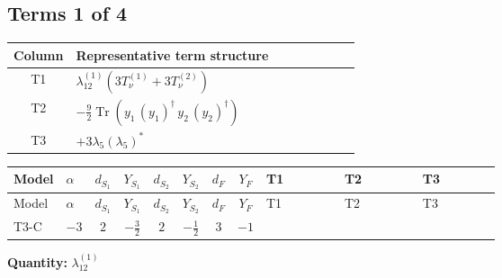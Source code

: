 \documentclass[8pt]{article}
\begin{document}
\begin{landscape}
\subsection*{Terms 1 of 4}
\begin{center}
\begin{tabular}{@{}c >{\raggedright\arraybackslash}p{0.82\linewidth}@{}}
\toprule
Column & Representative term structure \\
\midrule
T1 & \(\displaystyle {\lambda_{12}^{(1)}} (3 T_{\nu}^{(1)}+3 T_{\nu}^{(2)})\) \\
\midrule
T2 & \(\displaystyle -\frac{9}{2} \operatorname{Tr}\!\left({y_1}\,\left({y_1}\right)^{\dagger}\,{y_2}\,\left({y_2}\right)^{\dagger}\right)\) \\
\midrule
T3 & \(\displaystyle +3 {\lambda_5} \left({\lambda_5}\right)^{*}\) \\
\midrule
\bottomrule
\end{tabular}
\end{center}
\smallskip
\tiny
\begin{longtable}{@{}llcccccc >{\raggedright\arraybackslash}p{0.21\linewidth} >{\raggedright\arraybackslash}p{0.21\linewidth} >{\raggedright\arraybackslash}p{0.21\linewidth}@{}}
\toprule
Model & $\alpha$ & $d_{S_1}$ & $Y_{S_1}$ & $d_{S_2}$ & $Y_{S_2}$ & $d_F$ & $Y_F$ & T1 & T2 & T3 \\
\midrule
\endfirsthead
\toprule
Model & $\alpha$ & $d_{S_1}$ & $Y_{S_1}$ & $d_{S_2}$ & $Y_{S_2}$ & $d_F$ & $Y_F$ & T1 & T2 & T3 \\
\midrule
\endhead
T3-C & $-3$ & $2$ & $-\frac{3}{2}$ & $2$ & $-\frac{1}{2}$ & $3$ & $-1$ & \scriptsize\adjustbox{max width=\linewidth}{$\begin{gathered} {\lambda_{12}^{(1)}} (3 T_{\nu}^{(1)}+3 T_{\nu}^{(2)})\end{gathered}$} & \scriptsize\adjustbox{max width=\linewidth}{$\begin{gathered} -\frac{9}{2} \operatorname{Tr}\!\left({y_1}\,\left({y_1}\right)^{\dagger}\,{y_2}\,\left({y_2}\right)^{\dagger}\right)\end{gathered}$} & \scriptsize\adjustbox{max width=\linewidth}{$\begin{gathered} +3 {\lambda_5} \left({\lambda_5}\right)^{*}\end{gathered}$} \\
\midrule
\bottomrule
\end{longtable}
\clearpage
\noindent\textbf{Quantity: }$\lambda_{12}^{(1)}$\par\smallskip

\end{landscape}
\end{document}
